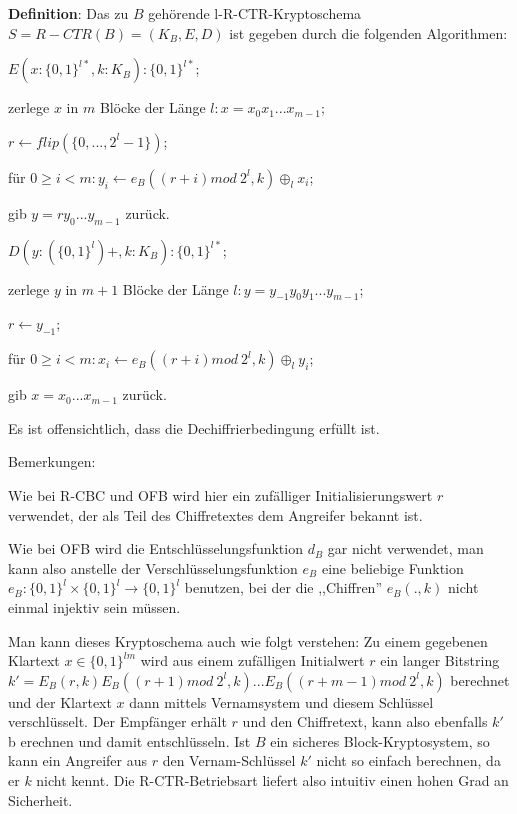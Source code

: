 \documentclass[a4paper]{article}
\begin{document}
\begin{multicols}{3}
    \textbf{Definition}: Das zu $B$ gehörende l-R-CTR-Kryptoschema $S=R-CTR(B) = (K_B,E,D)$ ist gegeben durch die folgenden Algorithmen:
    \begin{itemize*}
        \item $E(x:\{0,1\}^{l*},k:K_B) :\{0,1\}^{l*}$;
        \item zerlege $x$ in $m$ Blöcke der Länge $l:x=x_0 x_1 ...x_{m-1}$;
        \item $r\leftarrow flip(\{0,..., 2^l-1\})$;
        \item für $0\geq i < m:y_i\leftarrow e_B((r+i) mod\ 2^l,k)\oplus_l x_i$;
        \item gib $y=r y_0 ...y_{m-1}$ zurück.
        \item $D(y: (\{0,1\}^l)+,k:K_B) :\{0,1\}^{l*}$;
        \item zerlege $y$ in $m+1$ Blöcke der Länge $l:y=y_{-1} y_0 y_1 ...y_{m-1}$;
        \item $r\leftarrow y_{-1}$;
        \item für $0\geq i < m:x_i\leftarrow e_B((r+i) mod\ 2^l,k)\oplus_l y_i$;
        \item gib $x=x_0 ...x_{m-1}$ zurück.
    \end{itemize*}

    Es ist offensichtlich, dass die Dechiffrierbedingung erfüllt ist.

    Bemerkungen:
    \begin{itemize*}
        \item Wie bei R-CBC und OFB wird hier ein zufälliger Initialisierungswert $r$ verwendet, der als Teil des Chiffretextes dem Angreifer bekannt ist.
        \item Wie bei OFB wird die Entschlüsselungsfunktion $d_B$ gar nicht verwendet, man kann also anstelle der Verschlüsselungsfunktion $e_B$ eine beliebige Funktion $e_B:\{0,1\}^l\times\{0,1\}^l\rightarrow\{0,1\}^l$ benutzen, bei der die ,,Chiffren'' $e_B(.,k)$ nicht einmal injektiv sein müssen.
        \item Man kann dieses Kryptoschema auch wie folgt verstehen: Zu einem gegebenen Klartext $x\in\{0,1\}^{lm}$ wird aus einem zufälligen Initialwert $r$ ein langer Bitstring $k'=E_B(r,k) E_B((r+1) mod\ 2^l,k)... E_B((r+m-1) mod\ 2^l,k)$ berechnet und der Klartext $x$ dann mittels Vernamsystem und diesem Schlüssel verschlüsselt. Der Empfänger erhält $r$ und den Chiffretext, kann also ebenfalls $k'$ b erechnen und damit entschlüsseln. Ist $B$ ein sicheres Block-Kryptosystem, so kann ein Angreifer aus $r$ den Vernam-Schlüssel $k'$ nicht so einfach berechnen, da er $k$ nicht kennt. Die R-CTR-Betriebsart liefert also intuitiv einen hohen Grad an Sicherheit.
    \end{itemize*}


\end{multicols}
\end{document}
